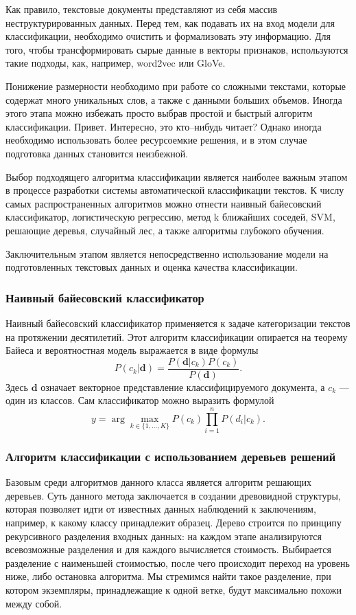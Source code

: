 Как правило, текстовые документы представляют из себя массив неструктурированных данных. Перед тем, как подавать их на вход модели для классификации, необходимо очистить и формализовать эту информацию. Для того, чтобы трансформировать сырые данные в векторы признаков, используются такие подходы, как, например, word2vec\cite{mikolov2013distributed} или GloVe\cite{pennington2014glove}.

Понижение размерности необходимо при работе со сложными текстами, которые содержат много уникальных слов, а также с данными больших объемов. Иногда этого этапа можно избежать просто выбрав простой и быстрый алгоритм классификации. Привет. Интересно, это кто--нибудь читает? Однако иногда необходимо использовать более ресурсоемкие решения, и в этом случае подготовка данных становится неизбежной.

Выбор подходящего алгоритма классификации является наиболее важным этапом в процессе разработки системы автоматической классификации текстов. К числу самых распространенных алгоритмов можно отнести наивный байесовский классификатор, логистическую регрессию, метод k ближайших соседей, SVM, решающие деревья, случайный лес, а также алгоритмы глубокого обучения.

Заключительным этапом является непосредственно использование модели на подготовленных текстовых данных и оценка качества классификации.

\subsubsection{Наивный байесовский классификатор}
Наивный байесовский классификатор применяется к задаче категоризации текстов на протяжении десятилетий. Этот алгоритм классификации опирается на теорему Байеса и вероятностная модель выражается в виде формулы
$$P(c_k | \mathbf{d}) = \frac{P(\mathbf{d}|c_k)P(c_k)}{P(\mathbf{d})}.$$
Здесь $\mathbf{d}$ означает векторное представление классифицируемого документа, а $c_k$ --- один из классов.
Сам классификатор можно выразить формулой
$$y = \arg \max_{k \in \{1, \dots, K\}} P(c_k) \prod_{i=1}^{n}P(d_i|c_k).$$

\subsubsection{Алгоритм классификации с использованием деревьев решений}
Базовым среди алгоритмов данного класса является алгоритм решающих деревьев\cite{magerman1995statistical}. Суть данного метода заключается в создании древовидной структуры, которая позволяет идти от известных данных наблюдений к заключениям, например, к какому классу принадлежит образец. Дерево строится по принципу рекурсивного разделения входных данных: на каждом этапе анализируются всевозможные разделения и для каждого вычисляется стоимость. Выбирается разделение с наименьшей стоимостью, после чего происходит переход на уровень ниже, либо остановка алгоритма. Мы стремимся найти такое разделение, при котором экземпляры, принадлежащие к одной ветке, будут максимально похожи между собой.

